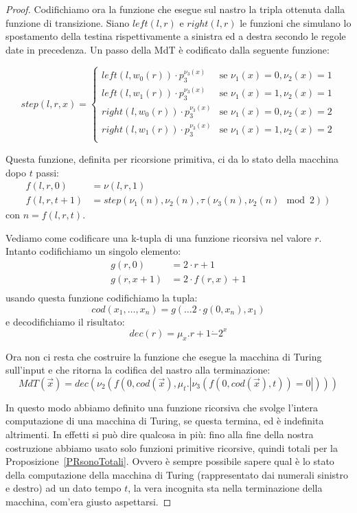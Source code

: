 \begin{proof}
Codifichiamo ora la funzione che esegue sul nastro la tripla ottenuta
dalla funzione di transizione. Siano $left(l,r)$ e $right(l,r)$ le
funzioni che simulano lo spostamento della testina rispettivamente a
sinistra ed a destra secondo le regole date in precedenza. Un passo
della MdT è codificato dalla seguente funzione:

$$step(l,r,x) = \left\{
\begin{array}{ll}
left(l, w_0(r)) \cdot p_3^{\nu_3(x)} & \text{se }\nu_1(x) = 0, \nu_2(x) = 1\\
left(l, w_1(r)) \cdot p_3^{\nu_3(x)} & \text{se }\nu_1(x) = 1, \nu_2(x) = 1\\
right(l, w_0(r)) \cdot p_3^{\nu_3(x)} & \text{se }\nu_1(x) = 0, \nu_2(x) = 2\\
right(l, w_1(r)) \cdot p_3^{\nu_3(x)} & \text{se }\nu_1(x) = 1, \nu_2(x) = 2\\
\end{array}
\right.$$

Questa funzione, definita per ricorsione primitiva, ci da lo stato
della macchina dopo $t$ passi:
\begin{align*}
f(l,r,0) &= \nu(l,r,1)\\
f(l,r,t+1) &= step(\nu_1(n), \nu_2(n), \tau(\nu_3(n), \nu_2(n) \mod 2) )
\end{align*}
con $n = f(l,r,t)$.

Vediamo come codificare una k-tupla di una funzione ricorsiva nel valore $r$.
Intanto codifichiamo un singolo elemento:
\begin{align*}
g(r,0) &= 2\cdot r + 1\\ 
g(r,x+1) &= 2\cdot f(r, x) + 1\\
\end{align*}
usando questa funzione codifichiamo la tupla:
$$cod(x_1, \dots, x_n) = g(\dots 2\cdot g(0, x_n), x_1)$$
e decodifichiamo il risultato:
$$dec(r) = \mu_x.r+1\dot{-}2^x$$

Ora non ci resta che costruire la funzione che esegue la macchina di
Turing sull'input e che ritorna la codifica del nastro alla
terminazione: $$MdT(\vec{x}) = dec(\nu_2(f(0,cod(\vec{x}),\mu_t .
|\nu_3(f(0,cod(\vec{x}),t)) = 0|)))$$

In questo modo abbiamo definito una funzione ricorsiva che svolge
l'intera computazione di una macchina di Turing, se questa termina, ed
è indefinita altrimenti. In effetti si può dire qualcosa in più: fino
alla fine della nostra costruzione abbiamo usato solo funzioni
primitive ricorsive, quindi totali per la
Proposizione~\ref{PRsonoTotali}. Ovvero è sempre possibile sapere qual
è lo stato della computazione della macchina di Turing (rappresentato
dai numerali sinistro e destro) ad un dato tempo $t$, la vera
incognita sta nella terminazione della macchina, com'era giusto
aspettarsi.


\end{proof}
